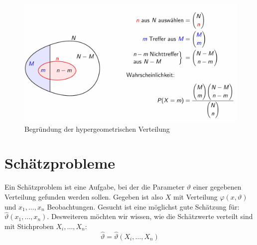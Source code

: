 \documentclass[../Main.tex]{subfiles}
\begin{document}
\begin{figure}[H]
    \centering
    \includegraphics[width=0.75\linewidth]{Images/begr-hg-verteilung.png}
    \caption{Begründung der hypergeometrischen Verteilung}
\end{figure}


\section{Schätzprobleme}
Ein Schätzproblem ist eine Aufgabe, bei der die Parameter \(\vartheta\) einer gegebenen
Verteilung gefunden werden sollen. Gegeben ist also \(X\) mit Verteilung
\(\varphi(x,\vartheta)\) und \(x_1,\dots,x_n\) Beobachtungen.
Gesucht ist eine möglichst gute Schätzung für: \(\hat{\vartheta}(x_1,\dots,x_n)\).
Desweiteren möchten wir wissen, wie die Schätzwerte verteilt sind mit
Stichproben \(X_i,\dots,X_n\):
\begin{equation}
    \hat{\vartheta} = \hat{\vartheta}(X_i,\dots,X_n)
\end{equation}



\end{document}
